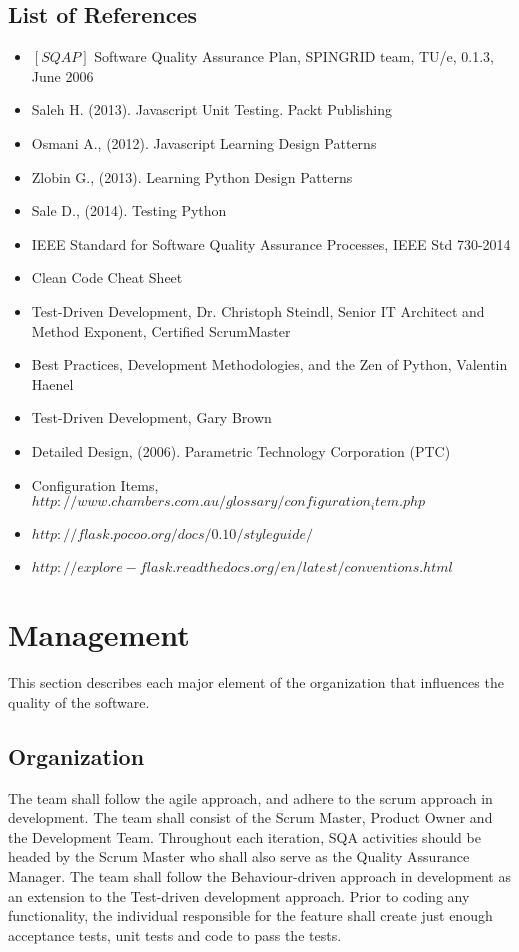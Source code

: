 \documentclass[12pt,letterpaper, margin=1in]{article}
\begin{document}
\newpage

\subsection{List of References}
\begin{itemize}
\item $[SQAP]$ Software Quality Assurance Plan, SPINGRID team, TU/e, 0.1.3, June 2006
\item Saleh H. (2013). Javascript Unit Testing.  Packt Publishing
\item Osmani A., (2012). Javascript Learning Design Patterns
\item Zlobin G., (2013). Learning Python Design Patterns
\item Sale D., (2014). Testing Python
\item IEEE Standard for Software Quality Assurance Processes, IEEE Std 730-2014
\item Clean Code Cheat Sheet
\item Test-Driven Development, Dr. Christoph Steindl, Senior IT Architect and Method Exponent, Certified ScrumMaster
\item Best Practices, Development Methodologies, and the Zen of Python, Valentin Haenel
\item Test-Driven Development, Gary Brown
\item Detailed Design, (2006). Parametric Technology Corporation (PTC)
\item Configuration Items, $http://www.chambers.com.au/glossary/configuration_item.php$
\item $http://flask.pocoo.org/docs/0.10/styleguide/$
\item $http://explore-flask.readthedocs.org/en/latest/conventions.html$
\end{itemize}

\newpage
\section{Management}
This section describes each major element of the organization that influences the quality of the software.

\subsection{Organization}

The team shall follow the agile approach, and adhere to the scrum approach in development. The team shall consist of the Scrum Master, Product Owner and the Development Team. Throughout each iteration, SQA activities should be headed by the Scrum Master who shall also serve as the Quality Assurance Manager. The team shall follow the Behaviour-driven approach in development as an extension to the Test-driven development approach. Prior to coding any functionality, the individual responsible for the feature shall create just enough acceptance tests, unit tests and code to pass the tests. 
\end{document}

